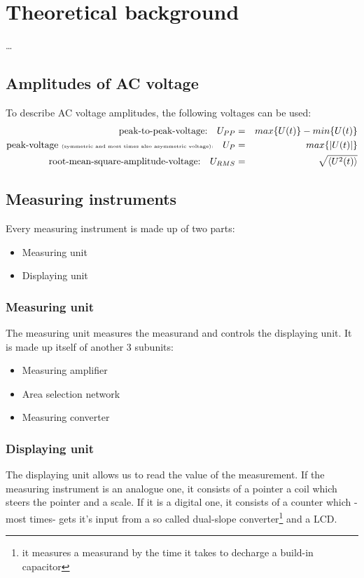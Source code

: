\section{Theoretical background}
…\subsection{Amplitudes of AC voltage}
To describe AC voltage amplitudes, the following voltages can be used:
\begin{eqnarray*}
	\text{peak-to-peak-voltage:}\quad U_{PP}&=&max\{U(t)\}-min\{U(t)\}\\
	\text{peak-voltage \tiny{(symmetric and most times also asymmetric voltage)}:}\quad U_P&=&max\{|U(t)|\}\\
	\text{root-mean-square-amplitude-voltage:}\quad U_{RMS}&=&\sqrt{\left<U^2(t)\right>}
\end{eqnarray*}
\subsection{Measuring instruments}
Every measuring instrument is made up of two parts:
\begin{itemize}
	\item{Measuring unit}
	\item{Displaying unit}
\end{itemize}
\subsubsection{Measuring unit}
The measuring unit measures the measurand and controls the displaying unit. It is made up itself of another 3 subunits:
\begin{itemize}
	\item{Measuring amplifier}
	\item{Area selection network}
	\item{Measuring converter}
\end{itemize}
\subsubsection{Displaying unit}
The displaying unit allows us to read the value of the measurement. If the measuring instrument is an analogue one, it consists of a pointer a coil which steers the pointer and a scale. If it is a digital one, it consists of a counter which -most times- gets it's input from a so called dual-slope converter\footnote{it measures a measurand by the time it takes to decharge a build-in capacitor} and a LCD.
